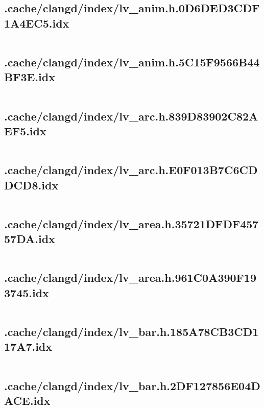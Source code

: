 \subsection{.cache/clangd/index/lv_anim.h.0D6DED3CDF1A4EC5.idx}
\inputminted[linenos,tabsize=2,breaklines, breakanywhere]{c}{lv_anim.h.0D6DED3CDF1A4EC5.idx}
\pagebreak

\subsection{.cache/clangd/index/lv_anim.h.5C15F9566B44BF3E.idx}
\inputminted[linenos,tabsize=2,breaklines, breakanywhere]{c}{lv_anim.h.5C15F9566B44BF3E.idx}
\pagebreak

\subsection{.cache/clangd/index/lv_arc.h.839D83902C82AEF5.idx}
\inputminted[linenos,tabsize=2,breaklines, breakanywhere]{c}{lv_arc.h.839D83902C82AEF5.idx}
\pagebreak

\subsection{.cache/clangd/index/lv_arc.h.E0F013B7C6CDDCD8.idx}
\inputminted[linenos,tabsize=2,breaklines, breakanywhere]{c}{lv_arc.h.E0F013B7C6CDDCD8.idx}
\pagebreak

\subsection{.cache/clangd/index/lv_area.h.35721DFDF45757DA.idx}
\inputminted[linenos,tabsize=2,breaklines, breakanywhere]{c}{lv_area.h.35721DFDF45757DA.idx}
\pagebreak

\subsection{.cache/clangd/index/lv_area.h.961C0A390F193745.idx}
\inputminted[linenos,tabsize=2,breaklines, breakanywhere]{c}{lv_area.h.961C0A390F193745.idx}
\pagebreak

\subsection{.cache/clangd/index/lv_bar.h.185A78CB3CD117A7.idx}
\inputminted[linenos,tabsize=2,breaklines, breakanywhere]{c}{lv_bar.h.185A78CB3CD117A7.idx}
\pagebreak

\subsection{.cache/clangd/index/lv_bar.h.2DF127856E04DACE.idx}
\inputminted[linenos,tabsize=2,breaklines, breakanywhere]{c}{lv_bar.h.2DF127856E04DACE.idx}
\pagebreak

